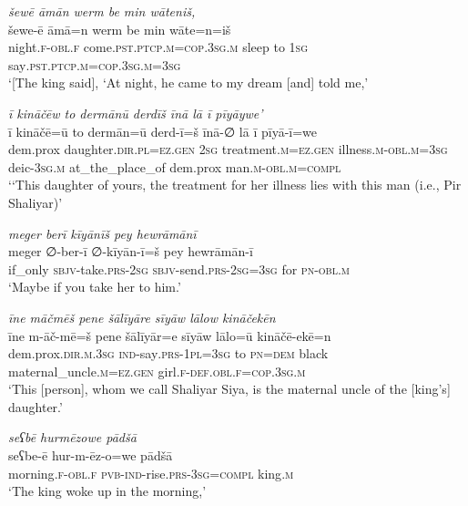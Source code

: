 \ea \label{ZP.32}
\textit{šewē āmān werm be min wāteniš,} \\ 
\gll šewe-ē āmā=n werm be min wāte=n=iš \\ 
 night\textsc{.f}\textsc{-obl}\textsc{.f} come\textsc{.pst}\textsc{.ptcp}\textsc{.m}\textsc{=cop}\textsc{.3sg}\textsc{.m} sleep to \textsc{1sg} say\textsc{.pst}\textsc{.ptcp}\textsc{.m}\textsc{=cop}\textsc{.3sg}\textsc{.m}\textsc{=3sg} \\ 
\glt `[The king said], ‘At night, he came to my dream [and] told me,'
\z 
 
\ea \label{ZP.33}
\textit{ī kināčēw to dermānū derdīš īnā lā ī pīyāywe’} \\ 
\gll ī kināčē=ū to dermān=ū derd-ī=š īnā-∅ lā ī pīyā-ī=we \\ 
 dem.prox daughter\textsc{.dir}\textsc{.pl}\textsc{\textsc{=ez.gen}} \textsc{2sg} treatment\textsc{.m}\textsc{\textsc{=ez.gen}} illness\textsc{.m}\textsc{-obl}\textsc{.m}\textsc{=3sg} deic\textsc{-3sg}\textsc{.m} at\_the\_place\_of dem.prox man\textsc{.m}\textsc{-obl}\textsc{.m}\textsc{=compl} \\ 
\glt `‘This daughter of yours, the treatment for her illness lies with this man (i.e., Pir Shaliyar)'
\z 
 
\ea \label{ZP.34}
\textit{meger berī kīyānīš pey hewrāmānī} \\ 
\gll meger ∅-ber-ī ∅-kīyān-ī=š pey hewrāmān-ī \\ 
 if\_only \textsc{sbjv-}take\textsc{.prs}-\textsc{2sg} \textsc{sbjv-}send\textsc{.prs}-\textsc{2sg}\textsc{=3sg} for \textsc{pn}\textsc{-obl}\textsc{.m} \\ 
\glt `Maybe if you take her to him.'
\z 
 
\ea \label{ZP.36}
\textit{īne māčmēš pene šālīyāre sīyāw lālow kināčekēn} \\ 
\gll īne m-āč-mē=š pene šālīyār=e sīyāw lālo=ū kināčē-ekē=n \\ 
 dem.prox\textsc{.dir}\textsc{.m}\textsc{.3sg} \textsc{ind-}say\textsc{.prs}\textsc{-1pl}\textsc{=3sg} to \textsc{pn}\textsc{=dem} black maternal\_uncle\textsc{.m}\textsc{\textsc{=ez.gen}} girl\textsc{.f}\textsc{-def}\textsc{.obl}\textsc{.f}\textsc{=cop}\textsc{.3sg}\textsc{.m} \\ 
\glt `This [person], whom we call Shaliyar Siya, is the maternal uncle of the [king’s] daughter.'
\z 
 
\ea \label{ZP.37}
\textit{seʕbē hurmēzowe pādšā} \\ 
\gll seʕbe-ē hur-m-ēz-o=we pādšā \\ 
 morning\textsc{.f}\textsc{-obl}\textsc{.f} \textsc{pvb-}\textsc{ind-}rise\textsc{.prs}\textsc{-3sg}\textsc{=compl} king\textsc{.m} \\ 
\glt `The king woke up in the morning,'
\z 
 
